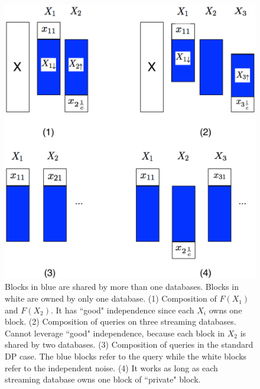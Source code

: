 \documentclass[11pt]{article}
\begin{document}
\begin{figure}[th]
\centering
\includegraphics[width=4.8in]{fig/stream_database1.pdf}
\caption{\label{stream_db1} Blocks in blue are shared by more than one databases. Blocks in white are owned by only one database. (1) Composition of $F(X_{1})$ and $F(X_{2})$. It has ``good" independence since each $X_{i}$ owns one block. (2) Composition of queries on three streaming databases. Cannot leverage ``good" independence, because each block in $X_{2}$ is shared by two databases. (3) Composition of queries in the standard DP case. The blue blocks refer to the query while the white blocks refer to the independent noise. (4) It works as long as each streaming database owns one block of ``private" block.}
\end{figure}
\end{document}
